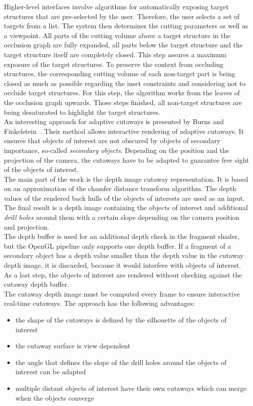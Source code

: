 Higher-level interfaces involve algorithms for automatically exposing target structures that are pre-selected by the user. Therefore, the user selects a set of targets from a list. The system then determines the cutting parameters as well as a viewpoint. All parts of the cutting volume above a target structure in the occlusion graph are fully expanded, all parts below the target structure and the target structure itself are completely closed. This step assures a maximum exposure of the target structures. To preserve the context from occluding structures, the corresponding cutting volume of each non-target part is being closed as much as possible regarding the inset constraints and considering not to occlude target structures. For this step, the algorithm works from the leaves of the occlusion graph upwards. Those steps finished, all non-target structures are being desaturated to highlight the target structures.\\
\newline
An interesting approach for adaptive cutaways is presented by Burns and Finkelstein~\cite{jour:adaptiveCutaways}. Their method allows interactive rendering of adaptive cutaways. It ensures that objects of interest are not obscured by objects of secondary importance, so-called \emph{secondary objects}. Depending on the position and the projection of the camera, the cutaways have to be adapted to guarantee free sight of the objects of interest.\\
The main part of the work is the depth image cutaway representation. It is based on an approximation of the chamfer distance transform algorithm. The depth values of the rendered back hulls of the objects of interests are used as an input. The final result is a depth image containing the objects of interest and additional \emph{drill holes} around them with a certain slope depending on the camera position and projection.\\
The depth buffer is used for an additional depth check in the fragment shader, but the OpenGL pipeline only supports one depth buffer. If a fragment of a secondary object has a depth value smaller than the depth value in the cutaway depth image, it is discarded, because it would interfere with objects of interest. As a last step, the objects of interest are rendered without checking against the cutaway depth buffer.\\
The cutaway depth image must be computed every frame to ensure interactive real-time cutaways. The approach has the following advantages:
\begin{itemize}
	\item the shape of the cutaways is defined by the silhouette of the objects of interest
	\item the cutaway surface is view dependent
	\item the angle that defines the slope of the drill holes around the objects of interest can be adapted
	\item multiple distant objects of interest have their own cutaways which can merge when the objects converge
\end{itemize}
